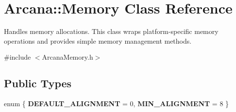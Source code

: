 \hypertarget{class_arcana_1_1_memory}{}\section{Arcana\+:\+:Memory Class Reference}
\label{class_arcana_1_1_memory}


Handles memory allocations. This class wraps platform-\/specific memory operations and provides simple memory management methods.  




{\ttfamily \#include $<$Arcana\+Memory.\+h$>$}

\subsection*{Public Types}
\begin{DoxyCompactItemize}
\item 
\mbox{\label{class_arcana_1_1_memory_af973bacdc73996a616bbd9dc20971a35}} 
enum \{ {\bfseries D\+E\+F\+A\+U\+L\+T\+\_\+\+A\+L\+I\+G\+N\+M\+E\+NT} = 0, 
{\bfseries M\+I\+N\+\_\+\+A\+L\+I\+G\+N\+M\+E\+NT} = 8
 \}
\end{DoxyCompactItemize}

